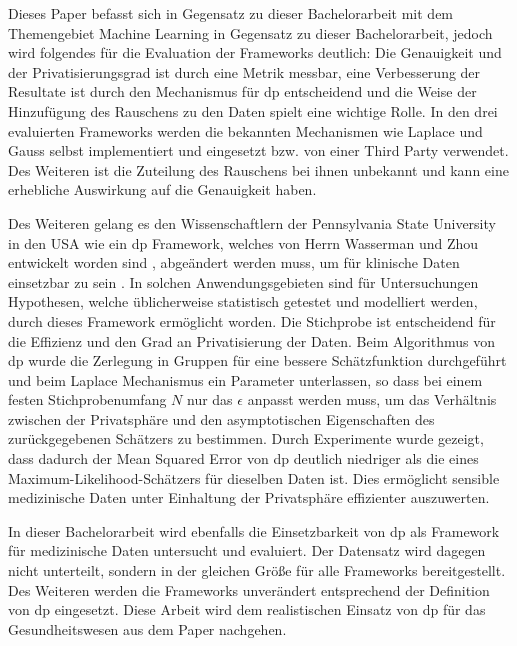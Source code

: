 Dieses Paper befasst sich in Gegensatz zu dieser Bachelorarbeit mit dem Themengebiet Machine Learning in Gegensatz zu dieser Bachelorarbeit, jedoch wird folgendes für die Evaluation der Frameworks deutlich: Die Genauigkeit und der Privatisierungsgrad ist durch eine Metrik messbar, eine Verbesserung der Resultate ist durch den Mechanismus für \gls{dp} entscheidend und die Weise der Hinzufügung des Rauschens zu den Daten spielt eine wichtige Rolle. In den drei evaluierten Frameworks werden die bekannten Mechanismen wie Laplace und Gauss selbst implementiert und eingesetzt bzw. von einer Third Party verwendet. Des Weiteren ist die Zuteilung des Rauschens bei ihnen unbekannt und kann eine erhebliche Auswirkung auf die Genauigkeit haben.


Des Weiteren gelang es den Wissenschaftlern der Pennsylvania State University in den USA wie ein \gls{dp} Framework, welches von Herrn Wasserman und Zhou entwickelt worden sind \parencite{DPFramework}, abgeändert werden muss, um für klinische Daten einsetzbar zu sein \parencite{Duy2009}. In solchen Anwendungsgebieten sind für Untersuchungen Hypothesen, welche üblicherweise statistisch getestet und modelliert werden, durch dieses Framework ermöglicht worden. Die Stichprobe ist entscheidend für die Effizienz und den Grad an Privatisierung der Daten. Beim Algorithmus von \gls{dp} wurde die Zerlegung in Gruppen für eine bessere Schätzfunktion durchgeführt und beim Laplace Mechanismus ein Parameter unterlassen, so dass bei einem festen Stichprobenumfang $N$ nur das $\epsilon$ anpasst werden muss, um das Verhältnis zwischen der Privatsphäre und den asymptotischen Eigenschaften des zurückgegebenen Schätzers zu bestimmen. Durch Experimente wurde gezeigt, dass dadurch der Mean Squared Error von \gls{dp} deutlich niedriger als die eines Maximum-Likelihood-Schätzers für dieselben Daten ist. Dies ermöglicht sensible medizinische Daten unter Einhaltung der Privatsphäre effizienter auszuwerten.


In dieser Bachelorarbeit wird ebenfalls die Einsetzbarkeit von \gls{dp} als Framework für medizinische Daten untersucht und evaluiert. Der Datensatz wird dagegen nicht unterteilt, sondern in der gleichen Größe für alle Frameworks bereitgestellt. Des Weiteren werden die Frameworks unverändert entsprechend der Definition von \gls{dp} eingesetzt. Diese Arbeit wird dem realistischen Einsatz von \gls{dp} für das Gesundheitswesen aus dem Paper nachgehen.

